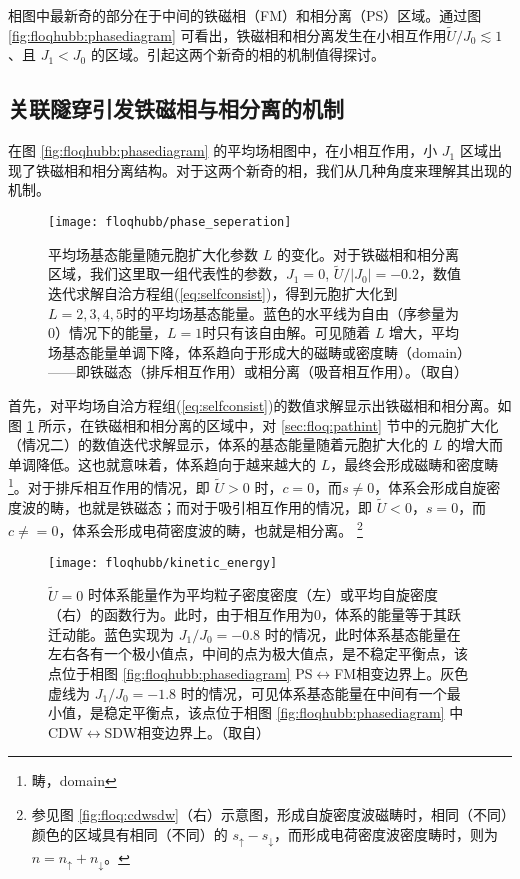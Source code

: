 相图中最新奇的部分在于中间的铁磁相（FM）和相分离（PS）区域。通过图 \ref{fig:floqhubb:phasediagram} 可看出，铁磁相和相分离发生在小相互作用$\tilde{U}/J_0\lesssim1$、且 $J_1<J_0$ 的区域。引起这两个新奇的相的机制值得探讨。


\subsection{关联隧穿引发铁磁相与相分离的机制}
在图 \ref{fig:floqhubb:phasediagram} 的平均场相图中，在小相互作用，小 $J_1$ 区域出现了铁磁相和相分离结构。对于这两个新奇的相，我们从几种角度来理解其出现的机制。

\begin{figure}[t]
\centering
\texttt{[image: floqhubb/phase\_seperation]}
\caption{平均场基态能量随元胞扩大化参数 $L$ 的变化。对于铁磁相和相分离区域，我们这里取一组代表性的参数，$J_1=0$, $\tilde{U}/|J_0|=-0.2$，数值迭代求解自洽方程组(\ref{eq:selfconsist})，得到元胞扩大化到$L=2,3,4,5$时的平均场基态能量。蓝色的水平线为自由（序参量为0）情况下的能量，$L=1$时只有该自由解。可见随着 $L$ 增大，平均场基态能量单调下降，体系趋向于形成大的磁畴或密度畴（domain）——即铁磁态（排斥相互作用）或相分离（吸音相互作用）。（取自）}
\label{fig:floqhubb:seperation}
\end{figure}

首先，对平均场自洽方程组(\ref{eq:selfconsist})的数值求解显示出铁磁相和相分离。如图 \ref{fig:floqhubb:seperation} 所示，在铁磁相和相分离的区域中，对 \ref{sec:floq:pathint} 节中的元胞扩大化（情况二）的数值迭代求解显示，体系的基态能量随着元胞扩大化的 $L$ 的增大而单调降低。这也就意味着，体系趋向于越来越大的 $L$，最终会形成磁畴和密度畴\footnote{畴，domain}。对于排斥相互作用的情况，即 $\tilde{U}>0$ 时，$c=0$，而$s\neq0$，体系会形成自旋密度波的畴，也就是铁磁态；而对于吸引相互作用的情况，即 $\tilde{U}<0$，$s=0$，而 $c\neq=0$，体系会形成电荷密度波的畴，也就是相分离。
\footnote{参见图 \ref{fig:floq:cdwsdw}（右）示意图，形成自旋密度波磁畴时，相同（不同）颜色的区域具有相同（不同）的 $s_{\uparrow}-s_{\downarrow}$，而形成电荷密度波密度畴时，则为 $n=n_{\uparrow}+n_{\downarrow}$。}

\begin{figure}[t]
\centering
\texttt{[image: floqhubb/kinetic\_energy]}
\caption{$\tilde{U}=0$ 时体系能量作为平均粒子密度密度（左）或平均自旋密度（右）的函数行为。此时，由于相互作用为0，体系的能量等于其跃迁动能。蓝色实现为 $J_1/J_0=-0.8$ 时的情况，此时体系基态能量在左右各有一个极小值点，中间的点为极大值点，是不稳定平衡点，该点位于相图 \ref{fig:floqhubb:phasediagram} PS$\leftrightarrow$FM相变边界上。灰色虚线为 $J_1/J_0=-1.8$ 时的情况，可见体系基态能量在中间有一个最小值，是稳定平衡点，该点位于相图 \ref{fig:floqhubb:phasediagram} 中 CDW$\leftrightarrow$SDW相变边界上。（取自）}
\label{fig:floqhubb:kinetic}
\end{figure}


